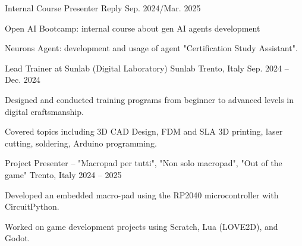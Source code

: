 

\begin{cventries}

  \cventry
    {Internal Course Presenter} %
    {Reply} %
    {} %
    {Sep. 2024/Mar. 2025} %
    {
      \begin{cvitems} %
        \item {Open AI Bootcamp: internal course about gen AI agents development}
        \item {Neurons Agent: development and usage of agent "Certification Study Assistant".}
      \end{cvitems}
    }


\cventry
  {Lead Trainer at Sunlab (Digital Laboratory)} %
  {Sunlab} %
  {Trento, Italy} %
  {Sep. 2024 – Dec. 2024} %
  {
    \begin{cvitems} %
      \item {Designed and conducted training programs from beginner to advanced levels in digital craftsmanship.}
      \item {Covered topics including 3D CAD Design, FDM and SLA 3D printing, laser cutting, soldering, Arduino programming.}
    \end{cvitems}
  }
\cventry
  {Project Presenter – "Macropad per tutti", "Non solo macropad", "Out of the game"} %
  {} %
  {Trento, Italy} %
  {2024 – 2025} %
  {
    \begin{cvitems} %
      \item {Developed an embedded macro-pad using the RP2040 microcontroller with CircuitPython.}
      \item {Worked on game development projects using Scratch, Lua (LOVE2D), and Godot.}
    \end{cvitems}
  }

\end{cventries}
